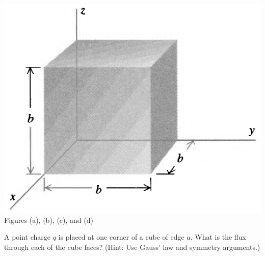 \documentclass[11pt,letterpaper,boxed]{hmcpset}
\begin{document}
\begin{problem}[Schey II-10]
\begin{center}
			\includegraphics[scale=0.25]{II-10d.png}
			\\Figures (a), (b), (c), and (d)
		\end{center}
			
		
	\end{problem}
	
	\begin{solution}
		\vfill
	\end{solution}
	\newpage

	\begin{problem}[HRK E27.11]
		A point charge $q$ is placed at one corner of a cube of edge $a$. What is the flux through each of the cube faces? (Hint: Use Gauss' law and symmetry arguments.)
		
	\end{problem}
	
	\begin{solution}
		\vfill
	\end{solution}
	\newpage	
	
\end{document}
